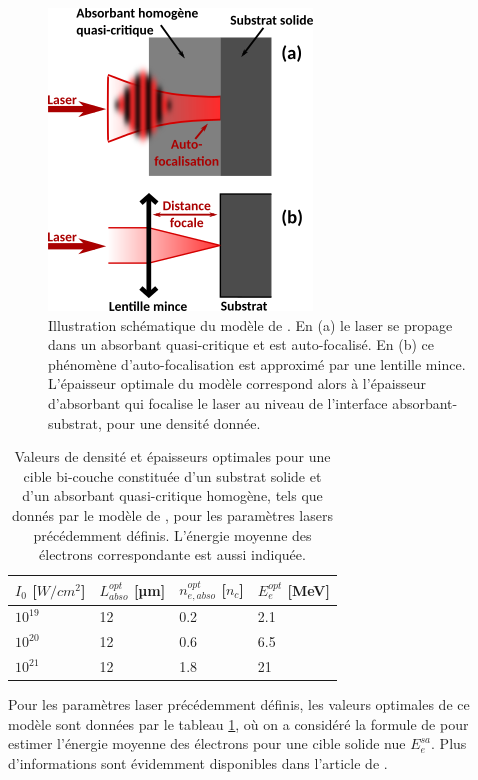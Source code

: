\begin{refsection}
\begin{figure}
	\centering
	\includegraphics[width=0.4\linewidth]{6-opti_numerique/Pazzaglia.png}
    \caption{Illustration schématique du modèle de \cite{pazzaglia_2020}. En (a) le laser se propage dans un absorbant quasi-critique et est auto-focalisé. En (b) ce phénomène d'auto-focalisation est approximé par une lentille mince. L'épaisseur optimale du modèle correspond alors à l'épaisseur d'absorbant qui focalise le laser au niveau de l'interface absorbant-substrat, pour une densité donnée.}
	\label{fig:62-modele_pazzaglia}
\end{figure}


\begin{table}
    \centering
    \begin{tabular}{ | l | l | l | l | }
    \hline
    $I_0$ [$W/cm^2$] & $L_{abso}^{opt}$ [µm] & $n_{e,abso}^{opt}$ [$n_c$] & $E_e^{opt}$ [MeV] \\
    \hline
    $10^{19}$        & 12                    & 0.2                        & 2.1               \\
    $10^{20}$        & 12                    & 0.6                        & 6.5               \\
    $10^{21}$        & 12                    & 1.8                        & 21                \\
    \hline
    \end{tabular}
    \caption{Valeurs de densité et épaisseurs optimales pour une cible bi-couche constituée d'un substrat solide et d'un absorbant quasi-critique homogène, tels que donnés par le modèle de \cite{pazzaglia_2020}, pour les paramètres lasers précédemment définis. L'énergie moyenne des électrons correspondante est aussi indiquée.}
    \label{tab:62-absorbant_opti}
\end{table}

Pour les paramètres laser précédemment définis, les valeurs optimales de ce modèle sont données par le tableau \ref{tab:62-absorbant_opti}, où on a considéré la formule de \cite{wilks_1992a} pour estimer l'énergie moyenne des électrons pour une cible solide nue $E_e^{sa}$. Plus d'informations sont évidemment disponibles dans l'article de \cite{pazzaglia_2020}.


\end{refsection}
